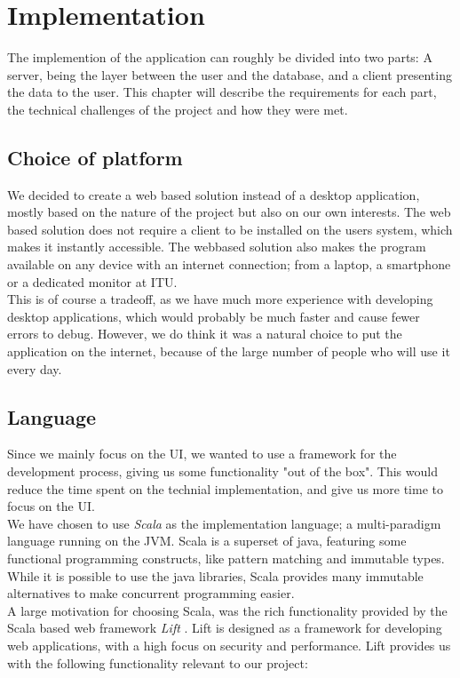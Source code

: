 \chapter{Implementation}
The implemention of the application can roughly be divided into two parts: A server, being the layer between the user and the database, and a client presenting the data to the user. This chapter will describe the requirements for each part, the technical challenges of the project and how they were met.


\section{Choice of platform}
We decided to create a web based solution instead of a desktop application, mostly based on the nature of the project but also on our own interests. The web based solution does not require a client to be installed on the users system, which makes it instantly accessible. The webbased solution also makes the program available on any device with an internet connection; from a laptop, a smartphone or a dedicated monitor at ITU.\\

This is of course a tradeoff, as we have much more experience with developing desktop applications, which would probably be much faster and cause fewer errors to debug. However, we do think it was a natural choice to put the application on the internet, because of the large number of people who will use it every day.

\section{Language}
Since we mainly focus on the UI, we wanted to use a framework for the development process, giving us some functionality "out of the box". This would reduce the time spent on the technial implementation, and give us more time to focus on the UI.\\
We have chosen to use \emph{Scala}\cite{scala} as the implementation language; a multi-paradigm language running on the JVM. Scala is a superset of java, featuring some functional programming constructs, like pattern matching and immutable types. While it is possible to use the java libraries, Scala provides many immutable alternatives to make concurrent programming easier. \\

A large motivation for choosing Scala, was the rich functionality provided by the Scala based web framework \emph{Lift} \cite{lift}. Lift is designed as a framework for developing web applications, with a high focus on security and performance. Lift provides us with the following functionality relevant to our project:

